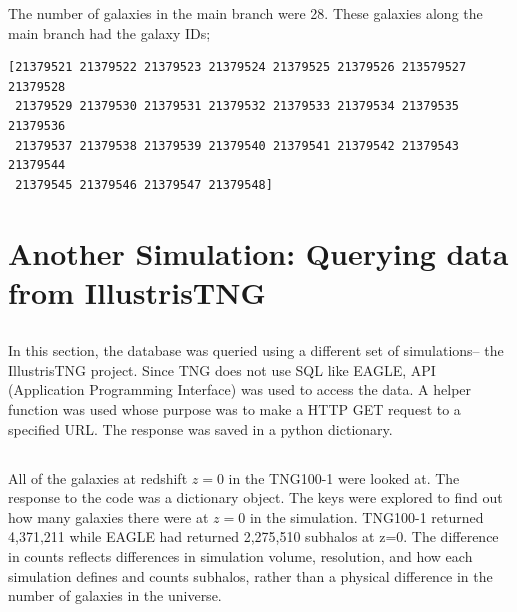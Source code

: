 \documentclass{article}
\begin{document}
The number of galaxies in the main branch were 28. These galaxies along the main branch had the galaxy IDs;
\begin{verbatim}
[21379521 21379522 21379523 21379524 21379525 21379526 213579527 21379528
 21379529 21379530 21379531 21379532 21379533 21379534 21379535 21379536
 21379537 21379538 21379539 21379540 21379541 21379542 21379543 21379544
 21379545 21379546 21379547 21379548]
\end{verbatim}
\section{Another Simulation: Querying data from IllustrisTNG}
\subsection{} %
In this section, the database was queried using a different set of simulations-- the IllustrisTNG project. Since TNG does not use SQL like EAGLE, API (Application Programming Interface) was used to access the data. A helper function was used whose purpose was to make a HTTP GET request to a specified URL. The response was saved in a python dictionary. 
\subsection{}  %
All of the galaxies at redshift $z=0$ in the TNG100-1 were looked at. The response to the code was a dictionary object. The keys were explored to find out how many galaxies there were at $z=0$ in the simulation. TNG100-1 returned 4,371,211 while EAGLE had returned 2,275,510 subhalos at z=0. The difference in counts reflects differences in simulation volume, resolution, and how each simulation defines and counts subhalos, rather than a physical difference in the number of galaxies in the universe.

\end{document}
